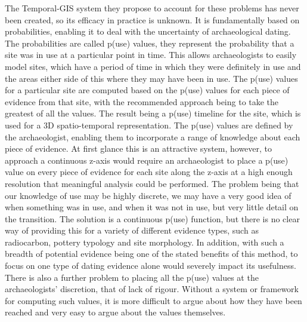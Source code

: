 The Temporal-GIS system they propose to account for these problems has never been created, so its efficacy in practice is unknown. It is fundamentally based on probabilities, enabling it to deal with the uncertainty of archaeological dating. The probabilities are called p(use) values, they represent the probability that a site was in use at a particular point in time. This allows archaeologists to easily model sites, which have a period of time in which they were definitely in use and the areas either side of this where they may have been in use. The p(use) values for a particular site are computed based on the p(use) values for each piece of evidence from that site, with the recommended approach being to take the greatest of all the values. The result being a p(use) timeline for the site, which is used for a 3D spatio-temporal representation. The p(use) values are defined by the archaeologist, enabling them to incorporate a range of knowledge about each piece of evidence. At first glance this is an attractive system, however, to approach a continuous z-axis would require an archaeologist to place a p(use) value on every piece of evidence for each site along the z-axis at a high enough resolution that meaningful analysis could be performed. The problem being that our knowledge of use may be highly discrete, we may have a very good idea of when something was in use, and when it was not in use, but very little detail on the transition. The solution is a continuous p(use) function, but there is no clear way of providing this for a variety of different evidence types, such as radiocarbon, pottery typology and site morphology. In addition, with such a breadth of potential evidence being one of the stated benefits of this method, to focus on one type of dating evidence alone would severely impact its usefulness. There is also a further problem to placing all the p(use) values at the archaeologists' discretion, that of lack of rigour. Without a system or framework for computing such values, it is more difficult to argue about how they have been reached and very easy to argue about the values themselves. 

